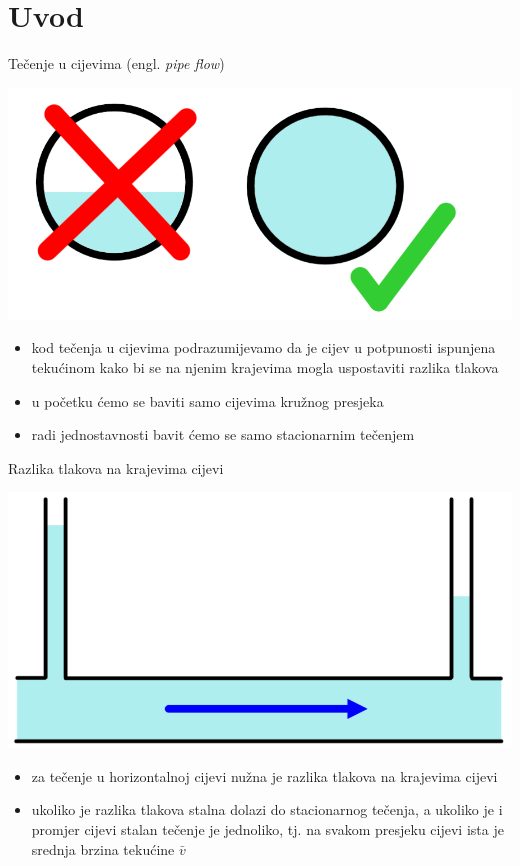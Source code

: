 \documentclass{beamer}
\begin{document}
\naslovnislajd

\section{Uvod}
\begin{frame}{Tečenje u cijevima (engl. \emph{pipe flow})}

\begin{center}
\includegraphics[width=0.5\paperwidth]{slike/slika1.PNG}
\par\end{center}
\begin{itemize}
\item kod tečenja u cijevima podrazumijevamo da je cijev u potpunosti ispunjena
tekućinom kako bi se na njenim krajevima mogla uspostaviti razlika
tlakova
\item u početku ćemo se baviti samo cijevima kružnog presjeka
\item radi jednostavnosti bavit ćemo se samo \alert{stacionarnim tečenjem}
\end{itemize}
\end{frame}

\begin{frame}{Razlika tlakova na krajevima cijevi}

\begin{center}
\includegraphics[width=0.5\paperwidth]{slike/slika2.PNG}
\par\end{center}
\begin{itemize}
\item za tečenje u horizontalnoj cijevi nužna je razlika tlakova na krajevima
cijevi
\item ukoliko je razlika tlakova stalna dolazi do stacionarnog tečenja,
a ukoliko je i promjer cijevi stalan tečenje je \alert{jednoliko},
tj. na svakom presjeku cijevi ista je srednja brzina tekućine $\bar{v}$
\end{itemize}
\end{frame}
\end{document}
